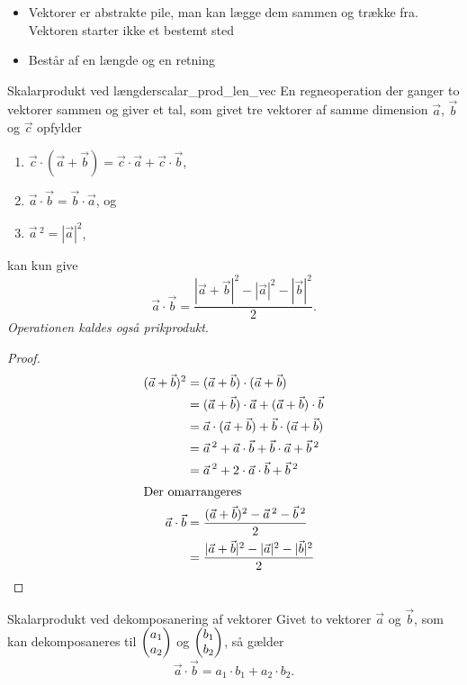 \documentclass{article}
\begin{document}
\begin{itemize}
    \item Vektorer er abstrakte pile, man kan lægge dem sammen og trække fra.
        Vektoren starter ikke et bestemt sted
    \item Består af en længde og en retning
\end{itemize}
\begin{theorem}{Skalarprodukt ved længder}{scalar_prod_len_vec}
    En regneoperation der ganger to vektorer sammen og giver et tal, som givet
    tre vektorer af samme dimension $\vec{a}$, $\vec{b}$ og $\vec{c}$ opfylder
    \begin{enumerate}
        \item $\vec{c} \cdot (\vec{a} + \vec{b}) = \vec{c} \cdot \vec{a} + \vec{c} \cdot \vec{b}$,
        \item $\vec{a} \cdot \vec{b} = \vec{b} \cdot \vec{a}$, og
        \item $\vec{a}\,^2 = |\vec{a}|^2$,
    \end{enumerate}
    kan kun give
    \[
        \vec{a} \cdot \vec{b} = \frac{|\vec{a} + \vec{b}|^2 - |\vec{a}|^2 - |\vec{b}|^2}{2}.
    \] 
    \textit{Operationen kaldes også prikprodukt}.
\end{theorem}
\begin{proof}
\begin{align*}
    (\vec{a} + \vec{b})^2 &= (\vec{a} + \vec{b}) \cdot (\vec{a} + \vec{b})\\
                          &= (\vec{a} + \vec{b}) \cdot \vec{a} + (\vec{a} + \vec{b}) \cdot \vec{b}\\
                          &= \vec{a} \cdot (\vec{a} + \vec{b}) + \vec{b} \cdot (\vec{a} + \vec{b})\\
                          &= \vec{a}\,^2 + \vec{a} \cdot \vec{b} + \vec{b} \cdot \vec{a} + \vec{b}\,^2\\
                          &= \vec{a}\,^2 + 2 \cdot \vec{a} \cdot \vec{b} + \vec{b}\,^2\\
                          \intertext{Der omarrangeres}
    \vec{a} \cdot \vec{b} &= \frac{(\vec{a} + \vec{b})^2 - \vec{a}\,^2 - \vec{b}\,^2}{2}\\
                          &= \frac{|\vec{a} + \vec{b}|^2 - |\vec{a}|^2 - |\vec{b}|^2}{2}\qedhere
\end{align*}
\end{proof}

\begin{theorem}{Skalarprodukt ved dekomposanering af vektorer}{}
    Givet to vektorer $\vec{a}$ og $\vec{b}$, som kan dekomposaneres til $ \begin{pmatrix} a_1\\ a_2 \end{pmatrix} $ og $ \begin{pmatrix} b_1\\ b_2 \end{pmatrix} $, så gælder
    \[
        \vec{a} \cdot \vec{b} = a_1 \cdot b_1 + a_2 \cdot b_2.
    \] 
\end{theorem}
\end{document}
